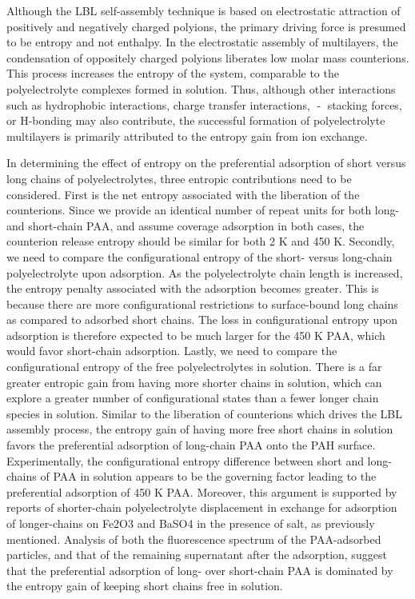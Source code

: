 \documentclass[journal=mamobx,manuscript=article]{achemso}
\begin{document}
Although the LBL self-assembly technique is based on electrostatic attraction of positively and negatively charged polyions, the primary driving force is presumed to be entropy and not enthalpy.  In the electrostatic assembly of multilayers, the condensation of oppositely charged polyions liberates low molar mass counterions.  This process increases the entropy of the system, comparable to the polyelectrolyte complexes formed in solution.\cite{Kabanov1994,Philipp1989}  Thus, although other interactions such as hydrophobic interactions, charge transfer interactions, - stacking forces, or H-bonding may also contribute, the successful formation of polyelectrolyte multilayers is primarily attributed to the entropy gain from ion 
exchange.\cite{Kotov1999,Bertrand2000}  

In determining the effect of entropy on the preferential adsorption of short versus long chains of polyelectrolytes, three entropic contributions need to be considered.  First is the net entropy associated with the liberation of the counterions.  Since we provide an identical number of repeat units for both long- and short-chain PAA, and assume coverage adsorption in both cases, the counterion release entropy should be similar for both 2 K and 450 K.  Secondly, we need to compare the configurational entropy of the short- versus long-chain polyelectrolyte upon adsorption.  As the polyelectrolyte chain length is increased, the entropy penalty associated with the adsorption becomes greater.  This is because there are more configurational restrictions to surface-bound long chains as compared to adsorbed short chains.  The loss in configurational entropy upon adsorption is therefore expected to be much larger for the 450 K PAA, which would favor short-chain adsorption.  Lastly, we need to compare the configurational entropy of the free polyelectrolytes in solution.  There is a far greater entropic gain from having more shorter chains in solution, which can explore a greater number of configurational states than a fewer longer chain species in solution.  Similar to the liberation of counterions which drives the LBL assembly process, the entropy gain of having more free short chains in solution favors the preferential adsorption of long-chain PAA onto the PAH surface.  Experimentally, the configurational entropy difference between short and long-chains of PAA in solution appears to be the governing factor leading to the preferential adsorption of 450 K PAA.  Moreover, this argument is supported by reports of shorter-chain polyelectrolyte displacement in exchange for adsorption of longer-chains on Fe2O3 and BaSO4 in the presence of salt, as previously mentioned.\cite{DeLaat1995}  Analysis of both the fluorescence spectrum of the PAA-adsorbed particles, and that of the remaining supernatant after the adsorption, suggest that the preferential adsorption of long- over short-chain PAA is dominated by the entropy gain of keeping short chains free in solution.
\end{document}
